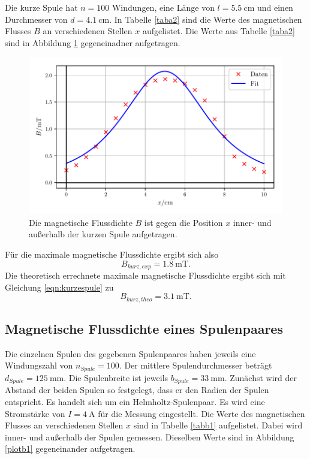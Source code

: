\noindent Die kurze Spule hat $n = \num{100}$ Windungen, eine Länge von
$l = \SI{5.5}{\centi\meter}$ und einen Durchmesser von
$d = \SI{4.1}{\centi\meter}$.
In Tabelle \ref{taba2} sind die Werte des magnetischen Flusses $B$
an verschiedenen Stellen $x$ aufgelistet.
Die Werte aus Tabelle \ref{taba2} sind in Abbildung \ref{plota2}
gegeneinadner aufgetragen.


\begin{figure}
    \centering
    \includegraphics{build/plota2.pdf}
    \caption{Die magnetische Flussdichte $B$ ist gegen die Position $x$ inner-
    und außerhalb der kurzen Spule aufgetragen.}
    \label{plota2}
\end{figure}

\noindent Für die maximale magnetische Flussdichte ergibt sich also
\begin{equation*}
   B_{kurz,exp} = \SI{1.8}{\milli\tesla}.
\end{equation*}
Die theoretisch errechnete maximale magnetische Flussdichte
ergibt sich mit Gleichung \eqref{eqn:kurzespule} zu
\begin{equation*}
   B_{kurz,theo} = \SI{3.1}{\milli\tesla}.
\end{equation*}

\subsection{Magnetische Flussdichte eines Spulenpaares}
Die einzelnen Spulen des gegebenen Spulenpaares haben jeweils
eine Windungszahl von $n_{Spule} = \num{100}$. Der mittlere
Spulendurchmesser beträgt $d_{Spule} = \SI{125}{\milli\meter}$.
Die Spulenbreite ist jeweils $b_{Spule} = \SI{33}{\milli\meter}$.
\newline
Zunächst wird der Abstand der beiden Spulen so festgelegt, dass
er den Radien der Spulen entspricht. Es handelt sich um ein
Helmholtz-Spulenpaar.
Es wird eine Stromstärke von $I = \SI{4}{\ampere}$ für die
Messung eingestellt.
Die Werte des magnetischen Flusses an verschiedenen Stellen
$x$ sind in Tabelle \ref{tabb1} aufgelistet. Dabei wird inner-
und außerhalb der Spulen gemessen.
Dieselben Werte sind in Abbildung \ref{plotb1} gegeneinander
aufgetragen.


